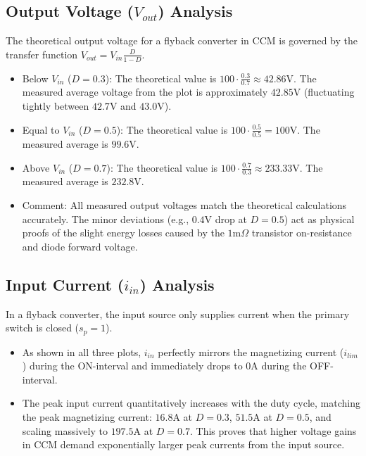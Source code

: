 \documentclass{article}
\begin{document}
\subsection{ Output Voltage ($V_{out}$) Analysis}
The theoretical output voltage for a flyback converter in CCM is governed by the transfer function $V_{out} = V_{in} \frac{D}{1-D}$.
\begin{itemize}
    \item Below $V_{in}$ ($D=0.3$): The theoretical value is $100 \cdot \frac{0.3}{0.7} \approx 42.86\text{V}$. The measured average voltage from the plot is approximately $42.85\text{V}$ (fluctuating tightly between $42.7\text{V}$ and $43.0\text{V}$).
\end{itemize}
\begin{itemize}
    \item Equal to $V_{in}$ ($D=0.5$): The theoretical value is $100 \cdot \frac{0.5}{0.5} = 100\text{V}$. The measured average is $99.6\text{V}$.
\end{itemize}
\begin{itemize}
    \item Above $V_{in}$ ($D=0.7$): The theoretical value is $100 \cdot \frac{0.7}{0.3} \approx 233.33\text{V}$. The measured average is $232.8\text{V}$.
\end{itemize}
\begin{itemize}
    \item Comment: All measured output voltages match the theoretical calculations accurately. The minor deviations (e.g., $0.4\text{V}$ drop at $D=0.5$) act as physical proofs of the slight energy losses caused by the $1\text{m}\Omega$ transistor on-resistance and diode forward voltage.
\end{itemize}
\subsection{Input Current ($i_{in}$) Analysis}
In a flyback converter, the input source only supplies current when the primary switch is closed ($s_p = 1$).

\begin{itemize}
    \item As shown in all three plots, $i_{in}$ perfectly mirrors the magnetizing current ($i_{lim}$) during the ON-interval and immediately drops to $0\text{A}$ during the OFF-interval.
\end{itemize}

\begin{itemize}
    \item The peak input current quantitatively increases with the duty cycle, matching the peak magnetizing current: $16.8\text{A}$ at $D=0.3$, $51.5\text{A}$ at $D=0.5$, and scaling massively to $197.5\text{A}$ at $D=0.7$. This proves that higher voltage gains in CCM demand exponentially larger peak currents from the input source.
\end{itemize}
\end{document}
